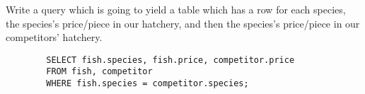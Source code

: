 Write a query which is going to yield a table which has a row for each species, the species's price/piece in our hatchery, and then the species's price/piece in our competitors' hatchery.

\begin{solution}
    \begin{lstlisting}
        SELECT fish.species, fish.price, competitor.price
        FROM fish, competitor
        WHERE fish.species = competitor.species;
    \end{lstlisting}
\end{solution}